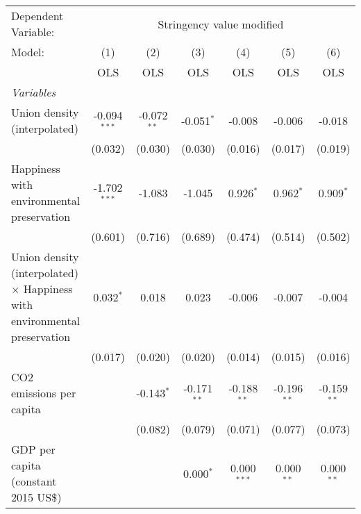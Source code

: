 
\begingroup
\centering
\begin{tabular}{lcccccc}
   \toprule
   Dependent Variable: & \multicolumn{6}{c}{Stringency value modified}\\
   Model:                                                                           & (1)            & (2)           & (3)           & (4)           & (5)           & (6)\\  
                                                                                    &  OLS           & OLS           & OLS           & OLS           & OLS           & OLS\\  
   \midrule
   \emph{Variables}\\
   Union density (interpolated)                                                     & -0.094$^{***}$ & -0.072$^{**}$ & -0.051$^{*}$  & -0.008        & -0.006        & -0.018\\   
                                                                                    & (0.032)        & (0.030)       & (0.030)       & (0.016)       & (0.017)       & (0.019)\\   
   Happiness with environmental preservation                                        & -1.702$^{***}$ & -1.083        & -1.045        & 0.926$^{*}$   & 0.962$^{*}$   & 0.909$^{*}$\\   
                                                                                    & (0.601)        & (0.716)       & (0.689)       & (0.474)       & (0.514)       & (0.502)\\   
   Union density (interpolated) $\times$ Happiness with environmental preservation  & 0.032$^{*}$    & 0.018         & 0.023         & -0.006        & -0.007        & -0.004\\   
                                                                                    & (0.017)        & (0.020)       & (0.020)       & (0.014)       & (0.015)       & (0.016)\\   
   CO2 emissions per capita                                                         &                & -0.143$^{*}$  & -0.171$^{**}$ & -0.188$^{**}$ & -0.196$^{**}$ & -0.159$^{**}$\\   
                                                                                    &                & (0.082)       & (0.079)       & (0.071)       & (0.077)       & (0.073)\\   
   GDP per capita (constant 2015 US\$)                                              &                &               & 0.000$^{*}$   & 0.000$^{***}$ & 0.000$^{**}$  & 0.000$^{**}$\\   

\end{tabular}
